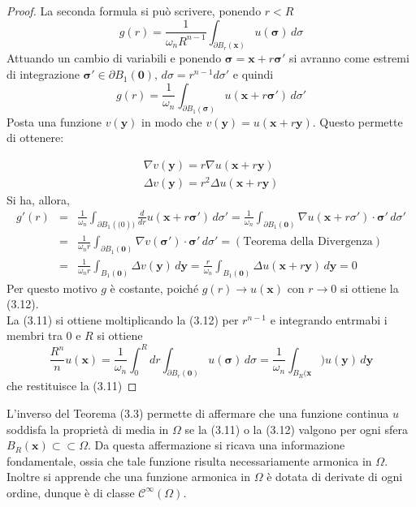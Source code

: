 \documentclass[a4paper,12pt, draft]{article}
\theoremstyle{break}
\numberwithin{equation}{section}
\begin{document}
\begin{proof}
  La seconda formula si può scrivere, ponendo \(r < R\)
  \[
    g(r) = \frac{1}{\omega_n R^{n-1}}\int_{\partial B_r(\bm{x})} u(\bm{\sigma}) \, d\sigma
  \]
  Attuando un cambio di variabili e ponendo \(\bm{\sigma} = \bm{x} + r\bm{\sigma}'\) si avranno come estremi di integrazione \(\bm{\sigma}' \in \partial B_1(\bm{0}), \, d\sigma = r^{n-1}d\sigma'\) e quindi
  \[
    g(r) = \frac{1}{\omega_n} \int_{\partial B_1(\bm{\sigma})} u(\bm{x}+r\bm{\sigma}') \, d\sigma'
  \] 
  Posta una funzione \(v(\bm{y})\) in modo che \(v(\bm{y}) = u(\bm{x} + r\bm{y})\). 
  Questo permette di ottenere: 

  \begin{eqnarray*}
    \nabla v(\bm{y}) = r\nabla u(\bm{x} + r\bm{y}) \\
  \Delta v(\bm{y}) = r^2\Delta u (\bm{x} + r\bm{y})
  \end{eqnarray*}
  Si ha, allora, 
  \begin{eqnarray*}
  g'(r) & = & \frac{1}{\omega_n} \int_{\partial B_1(\bm(0))} \frac{d}{dr}u(\bm{x} + r\bm{\sigma}') \, d\sigma' = \frac{1}{\omega_n} \int_{\partial B_1(\bm{0})} \nabla u(\bm{x} + r\sigma') \cdot \bm{\sigma}' \, d\sigma' \\
  & = & \frac{1}{\omega_n r} \int_{\partial B_1 (\bm{0})} \nabla v(\bm{\sigma}') \cdot \bm{\sigma}' \, d\sigma' = (\mbox{Teorema della Divergenza}) \\
  & = & \frac{1}{\omega_n r} \int_{B_1 (\bm{0})} \Delta v(\bm{y}) \, d\bm{y} = \frac{r}{\omega_n} \int_{B_1(\bm{0})} \Delta u(\bm{x} + r\bm{y}) \, d\bm{y} = 0
  \end{eqnarray*}
  Per questo motivo \(g\) è costante, poiché \(g(r) \to u(\bm{x})\) con \(r \to 0\) si ottiene la (3.12). \\
  La (3.11) si ottiene moltiplicando la (3.12) per \(r^{n-1}\) e integrando entrmabi i membri tra \(0 \mbox{ e } R\) si ottiene
  \[
    \frac{R^n}{n} u(\bm{x}) = \frac{1}{\omega_n} \int_0^Rdr \int_{\partial B_r(\mathbf{0})} u(\bm{\sigma}) \, d\sigma = \frac{1}{\omega_n} \int_{B_R(\bm{x}}) u(\bm{y}) \, d\bm{y}
  \]
  che restituisce la (3.11)
\end{proof}
L'inverso del Teorema (3.3) permette di affermare che una funzione continua \(u\) soddisfa la proprietà di media in \(\Omega\) se la (3.11) o la (3.12) valgono per ogni sfera \(B_R(\bm{x}) \subset \subset \Omega\).
Da questa affermazione si ricava una informazione fondamentale, ossia che tale funzione risulta necessariamente armonica in \(\Omega\). Inoltre si apprende che una funzione armonica in \(\Omega\) è dotata di derivate di ogni ordine, dunque è di classe \(\mathcal{C}^{\infty}(\Omega)\).
\end{document}
